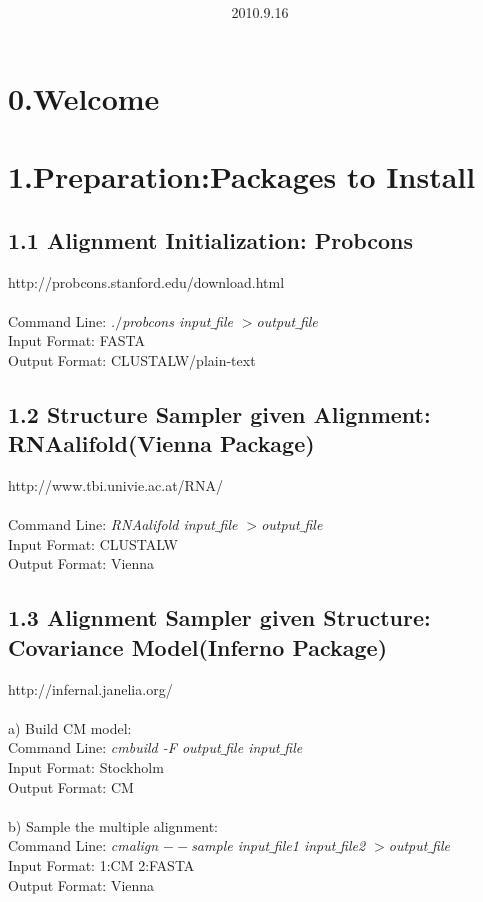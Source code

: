 \documentclass{article}
\title{\vspace{0.3in}\textmd{\textbf{\hmwkTitle}}}
\date{2010.9.16}
\author{\textbf{\hmwkAuthorName}}
\begin{document}
\begin{spacing}{1.1}
\maketitle
\section{0.Welcome}
\section{1.Preparation:Packages to Install}
\subsection{1.1 Alignment Initialization: Probcons}
\small{http://probcons.stanford.edu/download.html}\\\\
Command Line: \emph{.$/$probcons input$\_$file $>$output$\_$file} \\ 
Input Format: FASTA\\
Output Format: CLUSTALW/plain-text
\subsection{1.2 Structure Sampler given Alignment: RNAalifold(Vienna Package)}
\small{http://www.tbi.univie.ac.at/RNA/}\\\\
Command Line: \emph{RNAalifold input$\_$file $>$output$\_$file} \\ 
Input Format: CLUSTALW\\
Output Format: Vienna
\subsection{1.3 Alignment Sampler given Structure: Covariance Model(Inferno Package)}
\small{http://infernal.janelia.org/}\\\\
a) Build CM model:\\
Command Line: \emph{cmbuild -F output$\_$file input$\_$file}  \\ 
Input Format: Stockholm\\
Output Format: CM\\ \\
b) Sample the multiple alignment:\\
Command Line: \emph{cmalign $--$sample input$\_$file1 input$\_$file2 $>$output$\_$file} \\ 
Input Format: 1:CM  2:FASTA\\
Output Format: Vienna


\end{spacing}
\end{document}
